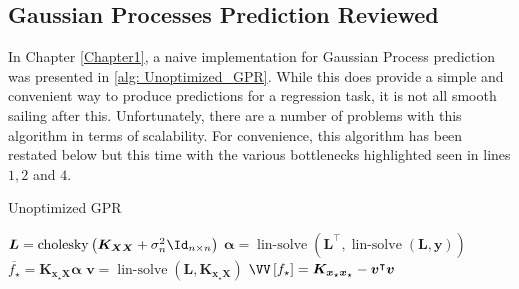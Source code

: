 \subsection{Gaussian Processes Prediction Reviewed}\label{Section5.1}

In Chapter \ref{Chapter1}, a naive implementation for Gaussian Process prediction was presented in \cref{alg: Unoptimized_GPR}. While this does provide a simple and convenient way to produce predictions for a regression task, it is not all smooth sailing after this. Unfortunately, there are a number of problems with this algorithm in terms of scalability. For convenience, this algorithm has been restated below but this time with the various bottlenecks highlighted seen in lines $1,2$ and $4$.

\setcounter{savecounter}{\value{algocf}}
\setcounter{algocf}{\value{GPRcount}}

{\centering
    \begin{minipage}{.85\linewidth}

        \begin{algorithm*}[H]
            \caption{Unoptimized GPR}
            \SetAlgoLined
            \DontPrintSemicolon

            \BlankLine
            $\bm{L} = \operatorname{cholesky} \left( \bm{K_{XX}} + \sigma_n^2 \Id_{n \times n} \right)$\;
            $\bm{\alpha} = \operatorname{lin-solve} \left( \bm{L}^{\intercal} , \operatorname{lin-solve} \left( \bm{L}, \bm{y} \right) \right)$\;
            $\overline{f_{\star}} = \bm{K_{x_{\star} X}} \bm{\alpha}$\;
            $\bm{v} = \operatorname{lin-solve} \left( \bm{L}, \bm{K_{x_{\star} X}} \right)$\;
            $\VV \left[ f_{\star} \right] = \bm{K_{x_{\star} x_{\star}}} - \bm{v}^{\intercal} \bm{v}$\;
            \BlankLine
        \end{algorithm*}
    \end{minipage}
    \par
}

\setcounter{algocf}{\value{savecounter}}

